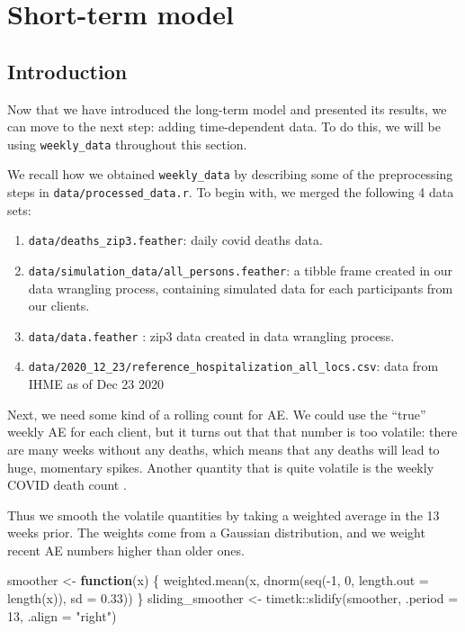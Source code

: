 \documentclass[
]{article}
\newenvironment{Shaded}{\begin{snugshade}}{\end{snugshade}}
\newcommand{\AttributeTok}[1]{\textcolor[rgb]{0.77,0.63,0.00}{#1}}
\newcommand{\ControlFlowTok}[1]{\textcolor[rgb]{0.13,0.29,0.53}{\textbf{#1}}}
\newcommand{\DecValTok}[1]{\textcolor[rgb]{0.00,0.00,0.81}{#1}}
\newcommand{\FloatTok}[1]{\textcolor[rgb]{0.00,0.00,0.81}{#1}}
\newcommand{\FunctionTok}[1]{\textcolor[rgb]{0.00,0.00,0.00}{#1}}
\newcommand{\NormalTok}[1]{#1}
\newcommand{\OtherTok}[1]{\textcolor[rgb]{0.56,0.35,0.01}{#1}}
\newcommand{\SpecialCharTok}[1]{\textcolor[rgb]{0.00,0.00,0.00}{#1}}
\newcommand{\StringTok}[1]{\textcolor[rgb]{0.31,0.60,0.02}{#1}}
\providecommand{\tightlist}{%
  \setlength{\itemsep}{0pt}\setlength{\parskip}{0pt}}
\begin{document}
\hypertarget{short-term-model}{%
\section{Short-term model}\label{short-term-model}}

\hypertarget{introduction}{%
\subsection{Introduction}\label{introduction}}

Now that we have introduced the long-term model and presented its
results, we can move to the next step: adding time-dependent data. To do
this, we will be using \texttt{weekly\_data} throughout this section.

We recall how we obtained \texttt{weekly\_data} by describing some of
the preprocessing steps in \texttt{data/processed\_data.r}. To begin
with, we merged the following 4 data sets:

\begin{enumerate}
\def\labelenumi{\arabic{enumi}.}
\tightlist
\item
  \texttt{data/deaths\_zip3.feather}: daily covid deaths data.
\item
  \texttt{data/simulation\_data/all\_persons.feather}: a tibble frame
  created in our data wrangling process, containing simulated data for
  each participants from our clients.
\item
  \texttt{data/data.feather} : zip3 data created in data wrangling
  process.
\item
  \texttt{data/2020\_12\_23/reference\_hospitalization\_all\_locs.csv}:
  data from IHME as of Dec 23 2020
\end{enumerate}

Next, we need some kind of a rolling count for AE. We could use the
``true'' weekly AE for each client, but it turns out that that number is
too volatile: there are many weeks without any deaths, which means that
any deaths will lead to huge, momentary spikes. Another quantity that is
quite volatile is the weekly COVID death count .

Thus we smooth the volatile quantities by taking a weighted average in
the 13 weeks prior. The weights come from a Gaussian distribution, and
we weight recent AE numbers higher than older ones.

\begin{Shaded}
\begin{Highlighting}[]
\NormalTok{smoother }\OtherTok{\textless{}{-}} \ControlFlowTok{function}\NormalTok{(x) \{ }
    \FunctionTok{weighted.mean}\NormalTok{(x, }\FunctionTok{dnorm}\NormalTok{(}\FunctionTok{seq}\NormalTok{(}\SpecialCharTok{{-}}\DecValTok{1}\NormalTok{, }\DecValTok{0}\NormalTok{, }\AttributeTok{length.out =} \FunctionTok{length}\NormalTok{(x)), }\AttributeTok{sd =} \FloatTok{0.33}\NormalTok{)) \}}
\NormalTok{sliding\_smoother }\OtherTok{\textless{}{-}}
\NormalTok{  timetk}\SpecialCharTok{::}\FunctionTok{slidify}\NormalTok{(smoother, }\AttributeTok{.period =} \DecValTok{13}\NormalTok{, }\AttributeTok{.align =} \StringTok{"right"}\NormalTok{)}
\end{Highlighting}
\end{Shaded}
\end{document}
